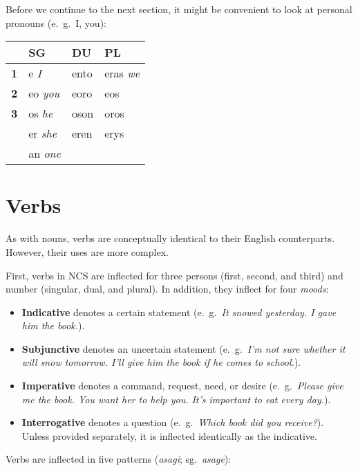 Before we continue to the next section, it might be convenient to look at personal pronouns (e.~g.~I, you):

\begin{center}
  \begin{tabular}{|r|l|l|l|}
    \hline
    & \textbf{SG} & \textbf{DU} & \textbf{PL} \\ \hline
    \textbf{1} & e \emph{I} & ento & eras \emph{we} \\ \hline
    \textbf{2} & eo \emph{you} & eoro & eos \\ \hline
    \textbf{3} & os \emph{he} & oson & oros \\
    & er \emph{she} & eren & erys \\
    & an \emph{one} & & \\ \hline
  \end{tabular}
\end{center}

\section{Verbs}

As with nouns, verbs are conceptually identical to their English counterparts. However, their uses are more complex.

First, verbs in NCS are inflected for three persons (first, second, and third) and number (singular, dual, and plural). In addition, they inflect for four \emph{moods}:

\begin{itemize}
  \item \textbf{Indicative} denotes a certain statement (e.~g.~\emph{It snowed yesterday. I gave him the book.}).
  \item \textbf{Subjunctive} denotes an uncertain statement (e.~g.~\emph{I'm not sure whether it will snow tomorrow. I'll give him the book if he \emph{comes to school}.}).
  \item \textbf{Imperative} denotes a command, request, need, or desire (e.~g.~\emph{Please give me the book. You want her to help you. It's important to eat every day.}).
  \item \textbf{Interrogative} denotes a question (e.~g.~\emph{Which book did you receive?}). Unless provided separately, it is inflected identically as the indicative.
\end{itemize}

Verbs are inflected in five patterns (\emph{asagi}; sg.~\emph{asage}): \\

